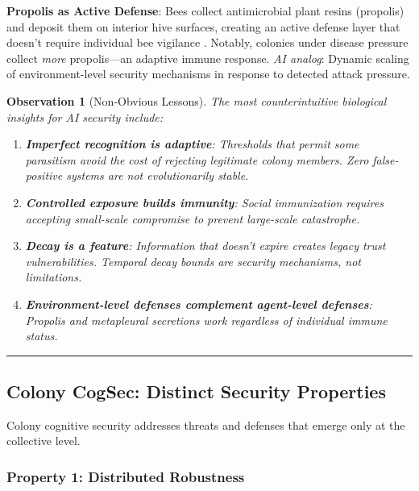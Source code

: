 \documentclass[
]{article}
\newtheorem{observation}[theorem]{Observation}
\begin{document}
\textbf{Propolis as Active Defense}: Bees collect antimicrobial plant
resins (propolis) and deposit them on interior hive surfaces, creating
an active defense layer that doesn't require individual bee vigilance
\citep{simone2009resin}. Notably, colonies under disease pressure
collect \emph{more} propolis---an adaptive immune response. \emph{AI
analog}: Dynamic scaling of environment-level security mechanisms in
response to detected attack pressure.

\begin{observation}[Non-Obvious Lessons]
\label{obs:non-obvious}
The most counterintuitive biological insights for AI security include:
\begin{enumerate}
\item \textbf{Imperfect recognition is adaptive}: Thresholds that permit some parasitism avoid the cost of rejecting legitimate colony members. Zero false-positive systems are not evolutionarily stable.
\item \textbf{Controlled exposure builds immunity}: Social immunization requires accepting small-scale compromise to prevent large-scale catastrophe.
\item \textbf{Decay is a feature}: Information that doesn't expire creates legacy trust vulnerabilities. Temporal decay bounds are security mechanisms, not limitations.
\item \textbf{Environment-level defenses complement agent-level defenses}: Propolis and metapleural secretions work regardless of individual immune status.
\end{enumerate}
\end{observation}

\begin{center}\rule{0.5\linewidth}{0.5pt}\end{center}

\subsection{Colony CogSec: Distinct Security
Properties}\label{sec:colony-properties}

Colony cognitive security addresses threats and defenses that emerge
only at the collective level.

\subsubsection{Property 1: Distributed
Robustness}\label{sec:distributed-robustness}
\end{document}
